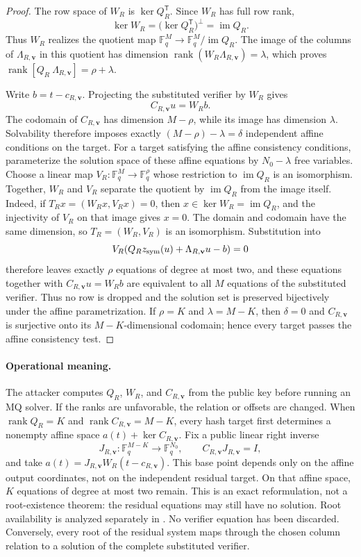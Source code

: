 \documentclass[11pt]{article}
\newcommand{\F}{\mathbb F}
\newcommand{\rank}{\operatorname{rank}}
\newcommand{\transpose}{\mathsf T}
\begin{document}
\begin{proof}
The row space of $W_R$ is $\ker Q_R^\transpose$.  Since $W_R$ has full row
rank,
\[
 \ker W_R=\bigl(\ker Q_R^\transpose\bigr)^\perp=\operatorname{im}Q_R.
\]
Thus $W_R$ realizes the quotient map
$\F_q^M\to\F_q^M/\operatorname{im}Q_R$.  The image of the columns of
$\Lambda_{R,\mathbf v}$ in this quotient has dimension
$\rank(W_R \Lambda_{R,\mathbf v})=\lambda$, which proves
$\rank[Q_R\ \Lambda_{R,\mathbf v}]=\rho+\lambda$.

Write $b=t-c_{R,\mathbf v}$.  Projecting the substituted verifier by $W_R$ gives
\[
 C_{R,\mathbf v}u=W_R b.
\]
The codomain of $C_{R,\mathbf v}$ has dimension $M-\rho$, while its image has
dimension $\lambda$.  Solvability therefore imposes exactly
$(M-\rho)-\lambda=\delta$ independent affine conditions on the target.
For a target satisfying the affine consistency conditions, parameterize the
solution space of these affine equations by $N_0-\lambda$ free variables.
Choose a linear map $V_R:\F_q^M\to\F_q^\rho$ whose restriction to
$\operatorname{im}Q_R$ is an isomorphism.  Together, $W_R$ and $V_R$ separate
the quotient by $\operatorname{im}Q_R$ from the image itself.  Indeed, if
$T_Rx=(W_Rx,V_Rx)=0$, then $x\in\ker W_R=\operatorname{im}Q_R$, and the
injectivity of $V_R$ on that image gives $x=0$.  The domain and codomain have
the same dimension, so $T_R=(W_R,V_R)$ is an isomorphism.  Substitution
into
\[
 V_R\!\left(Q_Rz_{\rm sym}(u)+\Lambda_{R,\mathbf v}u-b\right)=0
\]
therefore leaves exactly $\rho$ equations of degree at most two, and these
equations together with $C_{R,\mathbf v}u=W_Rb$ are equivalent to all $M$
equations of the substituted verifier.  Thus no row is dropped and the solution set is
preserved bijectively under the affine parametrization.  If $\rho=K$ and $\lambda=M-K$, then $\delta=0$ and
$C_{R,\mathbf v}$ is surjective onto its $M-K$-dimensional codomain; hence
every target passes the affine consistency test.
\end{proof}

\paragraph{Operational meaning.}
The attacker computes $Q_R$, $W_R$, and $C_{R,\mathbf v}$ from the public key before
running an MQ solver.  If the ranks are unfavorable, the relation or offsets
are changed.  When $\rank Q_R=K$ and $\rank C_{R,\mathbf v}=M-K$, every hash target first
determines a nonempty affine space $a(t)+\ker C_{R,\mathbf v}$.  Fix a public
linear right inverse
\[
 J_{R,\mathbf v}:\F_q^{M-K}\longrightarrow\F_q^{N_0},
 \qquad C_{R,\mathbf v}J_{R,\mathbf v}=I,
\]
and take
$a(t)=J_{R,\mathbf v}W_R(t-c_{R,\mathbf v})$.  This base point depends only
on the affine output coordinates, not on the independent residual target.
On that affine space,
$K$ equations of
degree at most two remain.  This is an exact reformulation, not a root-existence
theorem: the residual equations may still have no solution.  Root availability
is analyzed separately in .  No verifier equation has been
discarded.  Conversely, every root of the residual system maps through the
chosen column relation to a solution of the complete substituted verifier.
\end{document}
